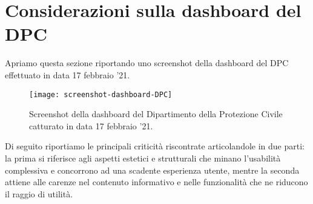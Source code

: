\documentclass[../../main.tex]{subfiles}
\begin{document}
\section{Considerazioni sulla dashboard del DPC}
Apriamo questa sezione riportando uno screenshot della dashboard del DPC effettuato in data 17 febbraio '21.

\begin{figure}[h]
    \centering
    \texttt{[image: screenshot-dashboard-DPC]}
    \caption{Screenshot della dashboard del Dipartimento della Protezione Civile catturato in data 17 febbraio '21.}
    \label{fig:screen-dashboard-DPC}
\end{figure}

Di seguito riportiamo le principali criticità riscontrate articolandole in due parti: la prima si riferisce agli aspetti estetici e strutturali che minano l'usabilità complessiva e concorrono ad una scadente esperienza utente, mentre la seconda attiene alle carenze nel contenuto informativo e nelle funzionalità che ne riducono il raggio di utilità.
\end{document}

